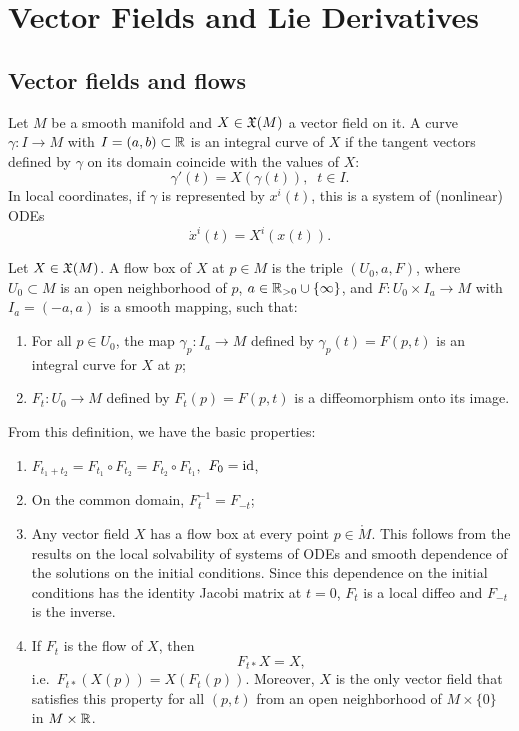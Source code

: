 \clearpage
\section{Vector Fields and Lie Derivatives}


\subsection{Vector fields and flows}


\begin{defn}
Let $M$ be a smooth manifold and $X\in\mathfrak{X}(M)$ a vector field on it. A curve $\gamma:I\to M$ with $I=(a,b)\subset\mathbb{R} $ is an integral curve of $X$ if the tangent vectors defined by $\gamma$ on its domain coincide with the values of $X$: 
\[
\gamma'(t)=X(\gamma(t)),\;\;t\in I.
\]
In local coordinates, if $\gamma$ is represented by $x^i(t)$, this is a system of (nonlinear) ODEs
\[
\dot x^i(t)=X^i(x(t)).
\]
\end{defn}
\begin{defn}
Let $X\in\mathfrak{X}(M)$. A flow box of $X$ at $p\in M$ is the triple $(U_0,a,F)$, where $U_0\subset M$ is an open neighborhood of $p$, $a\in \mathbb{R}_{>0}\cup\{\infty\}$, and $F:U_0\times I_a\to M$ with $I_a=(-a,a)$ is a smooth mapping, such that:
\begin{enumerate}
    \item For all $p\in U_0$, the map $\gamma_p:I_a\to M$ defined by $\gamma_p(t)=F(p,t)$ is an integral curve for $X$ at $p$;
    \item $F_t:U_0\to M$ defined by $F_t(p)=F(p,t)$ is a diffeomorphism onto its image.
\end{enumerate}
\end{defn}
From this definition, we have the basic properties:
\begin{enumerate}
    \item $F_{t_1+t_2}=F_{t_1}\circ F_{t_2}=F_{t_2}\circ F_{t_1},$ $F_0=\operatorname{id}$,
    \item On the common domain, $F_t^{-1}=F_{-t}$;
    \item Any vector field $X$ has a flow box at every point $p\in \mathring{M}$. This follows from the results on the local solvability of systems of ODEs and smooth dependence of the solutions on the initial conditions. Since this dependence on the initial conditions has the identity Jacobi matrix at $t=0$, $F_t$ is a local diffeo and $F_{-t}$ is the inverse.
    \item If $F_t$ is the flow of $X$, then \[F_{t\ast}X=X,\] i.e.\ $F_{t\ast}(X(p))=X(F_t(p))$. Moreover, $X$ is the only vector field that satisfies this property for all $(p,t)$ from an open neighborhood of $M\times\{0\}$ in $M\times\mathbb{R} $.
\end{enumerate}

